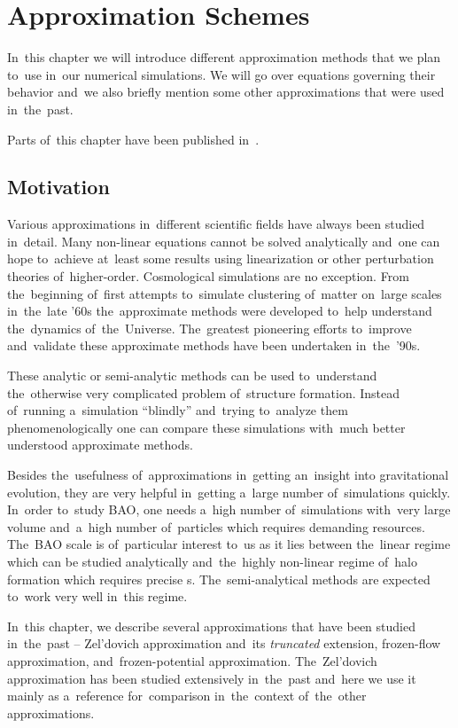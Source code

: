 \chapter{Approximation Schemes}
\label{chpt:app_schemes}
In~this chapter we will introduce different approximation methods that we plan to~use in~our numerical simulations. We will go over equations governing their behavior and~we also briefly mention some other approximations that were used in~the~past.

Parts of~this chapter have been published in~\textcite{2020MNRAS.493.2085V}.

\section{Motivation}
Various approximations in~different scientific fields have always been studied in~detail. Many non-linear equations cannot be solved analytically and~one can hope to~achieve at~least some results using linearization or other perturbation theories of~higher-order. Cosmological simulations are no exception. From the~beginning of~first attempts to~simulate clustering of~matter on~large scales in~the~late '60s the~approximate methods were developed to~help understand the~dynamics of~the~Universe. The~greatest pioneering efforts to~improve and~validate these approximate methods have been undertaken in~the~'90s.

These analytic or semi-analytic methods can be used to~understand the~otherwise very complicated problem of~structure formation. Instead of~running a~simulation ``blindly'' and~trying to~analyze them phenomenologically one can compare these simulations with~much better understood approximate methods.

Besides the~usefulness of~approximations in~getting an~insight into gravitational evolution, they are very helpful in~getting a~large number of~simulations quickly. In~order to~study BAO, one needs a~high number of~simulations with~very large volume and~a~high number of~particles which requires demanding resources. The~BAO scale is of~particular interest to~us as it lies between the~linear regime which can be studied analytically and~the~highly non-linear regime of~halo formation which requires precise \nbodysim s. The~semi-analytical methods are expected to~work very well in~this regime.

In~this chapter, we describe several approximations that have been studied in~the~past -- Zel'dovich approximation and~its \textit{truncated} extension, frozen-flow approximation, and~frozen-potential approximation. The~Zel'dovich approximation has been studied extensively in~the~past and~here we use it mainly as a~reference for~comparison in~the~context of~the~other approximations.

